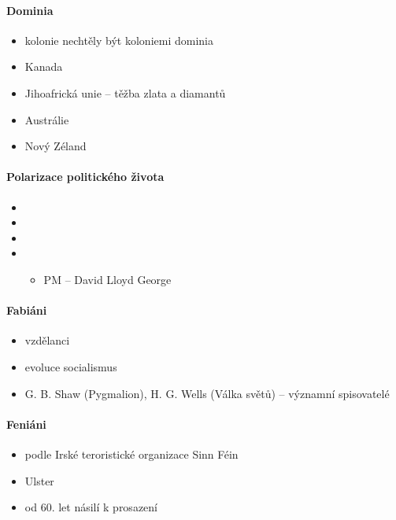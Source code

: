 \paragraph{Dominia}
\begin{itemize}
\item kolonie nechtěly být koloniemi \ra dominia
\item Kanada
\item Jihoafrická unie -- těžba zlata a diamantů
\item Austrálie
\item Nový Zéland
\end{itemize}

\paragraph{Polarizace politického života}
\begin{itemize}
\item {}
\item {}
\item {}
\item {}
	\begin{itemize}
	\item PM -- David Lloyd George
	\end{itemize}
\end{itemize}

\paragraph{Fabiáni}
\begin{itemize}
\item vzdělanci
\item evoluce \ra socialismus
\item G. B. Shaw (Pygmalion), H. G. Wells (Válka světů) -- významní spisovatelé
\end{itemize}

\paragraph{Feniáni}
\begin{itemize}
\item podle Irské teroristické organizace Sinn Féin
\item Ulster
\item od 60. let násilí k prosazení
\end{itemize}

